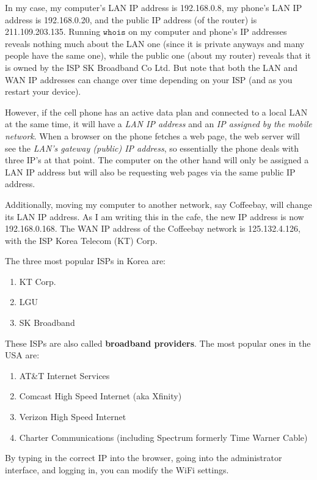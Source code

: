 \documentclass[a4paper, 12pt]{report}
\theoremstyle{remark}
\theoremstyle{definition}
\begin{document}
\begin{example}
In my case, my computer's LAN IP address is 192.168.0.8, my phone's LAN IP address is 192.168.0.20, and the public IP address (of the router) is 211.109.203.135. Running $\texttt{whois}$ on my computer and phone's IP addresses reveals nothing much about the LAN one (since it is private anyways and many people have the same one), while the public one (about my router) reveals that it is owned by the ISP SK Broadband Co Ltd. But note that both the LAN and WAN IP addresses can change over time depending on your ISP (and as you restart your device). 

However, if the cell phone has an active data plan and connected to a local LAN at the same time, it will have a \textit{LAN IP address} and an \textit{IP assigned by the mobile network}. When a browser on the phone fetches a web page, the web server will see the \textit{LAN’s gateway (public) IP address}, so essentially the phone deals with three IP’s at that point. The computer on the other hand will only be assigned a LAN IP address but will also be requesting web pages via the same public IP address. 

Additionally, moving my computer to another network, say Coffeebay, will change its LAN IP address. As I am writing this in the cafe, the new IP address is now 192.168.0.168. The WAN IP address of the Coffeebay network is 125.132.4.126, with the ISP Korea Telecom (KT) Corp. 
\end{example}

The three most popular ISPs in Korea are: 
\begin{enumerate}
    \item KT Corp. 
    \item LGU
    \item SK Broadband 
\end{enumerate}
These ISPs are also called \textbf{broadband providers}. The most popular ones in the USA are:
\begin{enumerate}
    \item AT\&T Internet Services
    \item Comcast High Speed Internet (aka Xfinity)
    \item Verizon High Speed Internet
    \item Charter Communications (including Spectrum formerly Time Warner Cable)
\end{enumerate}

By typing in the correct IP into the browser, going into the administrator interface, and logging in, you can modify the WiFi settings.  
\end{document}
